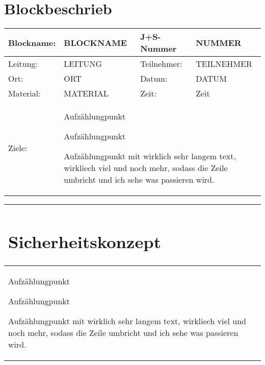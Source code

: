 \documentclass[12pt]{article}
\newcommand{\tstamp}{DATUM}
\begin{document}
\section*{Blockbeschrieb}
	\begin{tabular}{|p{2.5cm}|p{5.5cm}|p{2.5cm}|p{5.5cm}|}
	\hline
	Blockname: 	& BLOCKNAME	& J+S-Nummer	& NUMMER \\ \hline
	Leitung:		& LEITUNG		& Teilnehmer:	& TEILNEHMER \\ \hline
	Ort:			& ORT			& Datum:		& \tstamp \\ \hline
	Material:		& MATERIAL		& Zeit:		& Zeit \\ \hline
	Ziele:		&  \multicolumn{3}{p{13.5cm+4\tabcolsep+2\arrayrulewidth}|}{\begin{compactitem} %
		\item Aufz\"ahlungpunkt
		\item Aufz\"ahlungpunkt
 		\item Aufz\"ahlungpunkt mit wirklich sehr langem text, wirkliech viel und noch mehr, sodass die Zeile umbricht und ich sehe was passieren wird. %
 	\end{compactitem}} \\
	\hline
\end{tabular}



\begin{tabular}{|p{17.5cm+3\arrayrulewidth}|}
	\hline
	\parbox[0pt][1.5cm][c]{0cm}{\section*{Sicherheitskonzept}}\\
	\hline
	\begin{compactitem}
		 \item Aufz\"ahlungpunkt
		 \item Aufz\"ahlungpunkt
 		\item Aufz\"ahlungpunkt mit wirklich sehr langem text, wirkliech viel und noch mehr, sodass die Zeile umbricht und ich sehe was passieren wird.
 	\end{compactitem}\\
 	\hline 
\end{tabular}
\end{document}
